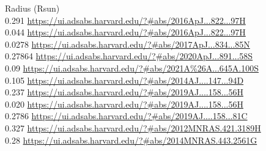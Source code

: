Radius (Rsun)\\
0.291 \url{https://ui.adsabs.harvard.edu/?#abs/2016ApJ...822...97H}\\
0.044 \url{https://ui.adsabs.harvard.edu/?#abs/2016ApJ...822...97H}\\
0.0278 \url{https://ui.adsabs.harvard.edu/?#abs/2017ApJ...834...85N}\\
0.27864 \url{https://ui.adsabs.harvard.edu/?#abs/2020ApJ...891...58S}\\
0.09 \url{https://ui.adsabs.harvard.edu/?#abs/2021A%26A...645A.100S}\\
0.105 \url{https://ui.adsabs.harvard.edu/?#abs/2014AJ....147...94D}\\
0.237 \url{https://ui.adsabs.harvard.edu/?#abs/2019AJ....158...56H}\\
0.020 \url{https://ui.adsabs.harvard.edu/?#abs/2019AJ....158...56H}\\
0.2786 \url{https://ui.adsabs.harvard.edu/?#abs/2019AJ....158...81C}\\
0.327 \url{https://ui.adsabs.harvard.edu/?#abs/2012MNRAS.421.3189H}\\
0.28 \url{https://ui.adsabs.harvard.edu/?#abs/2014MNRAS.443.2561G}\\